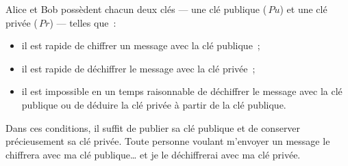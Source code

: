 \documentclass[a4paper,11pt]{article}
\begin{document}
\begin{center}
\end{center}

\vspace{2cm}


Alice et Bob possèdent chacun deux clés — une clé publique
({\color{green!70!black}\faKey}\,$Pu$) et une clé privée
({\color{red}\faKey}\,$Pr$) — telles que~:

\begin{itemize}
	\item il est rapide de chiffrer un message avec la clé publique ;
	
	\item il est rapide de déchiffrer le message avec la clé privée~;

	\item il est impossible en un temps raisonnable de déchiffrer le
		message avec la clé publique ou de déduire la clé privée à partir de la 
		clé publique.

\end{itemize}

Dans ces conditions, il suffit de publier sa clé publique et de conserver
précieusement sa clé privée. Toute personne voulant m'envoyer un message le
chiffrera avec ma clé publique… et je le déchiffrerai avec ma clé privée. 
\end{document}
